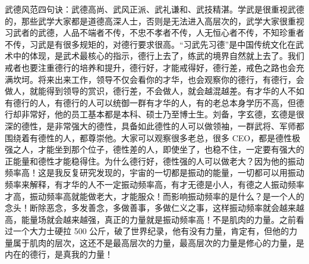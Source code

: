 武德风范四句诀：武德高尚、武风正派、武礼谦和、武技精湛。学武是很重视武德的，那些武学大家都是道德高深人士，否则是无法进入高层次的，武学大家很重视习武者的武德，人品不端者不传，不忠不孝者不传，人无恒心者不传，不知珍重者不传，习武是有很多规矩的，对德行要求很高。“习武先习德”是中国传统文化在武术中的体现，是武术最核心的指示，德行上去了，练武的境界自然就上去了。我们戒者也要注重德行的培养和提升，德行好，才能戒得好，德行差，戒色之路也会充满坎坷。将来出来工作，领导不仅会看你的才华，也会观察你的德行，有德行，会做人，就能得到领导的赏识，德行差，不会做人，就会越混越差。有才华的人不如有德行的人，有德行的人可以统御一群有才华的人，有的老总本身学历不高，但德行却非常好，他的员工基本都是本科、硕士乃至博士生。刘备，字玄德，玄德是很深的德性，是非常强大的德性，具备如此德性的人可以做领袖，一群武将、军师都围绕着有德性的人，都尊崇他。大家可以观察很多老总，很多 CEO，都是德性极强之人，才能坐到那个位子，德性差的人，即使坐了，也稳不住，一定要有强大的正能量和德性才能稳得住。为什么德行好，德性强的人可以做老大？因为他的振动频率高！这是我反复研究发现的，宇宙的一切都是振动的能量，一切都可以用振动频率来解释，有才华的人不一定振动频率高，有才无德是小人，有德之人振动频率才高，振动频率高就能做老大，才能服众！而影响振动频率的是什么？是一个人的念头！断除恶念，多发善念，多做善事，多做仁义之事，这样振动频率就会越来越高，能量场就会越来越强，真正的力量就是振动频率高！不是肌肉的力量。之前看过一个大力士硬拉 500 公斤，破了世界纪录，他有没有力量，肯定有，但他的力量属于肌肉的层次，这还不是最高层次的力量，最高层次的力量是修心的力量，是内在的德行，是真我的力量！

